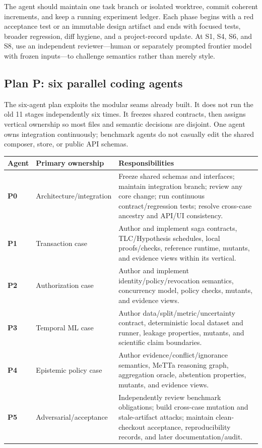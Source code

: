 \documentclass[11pt]{article}
\begin{document}
The agent should maintain one task branch or isolated worktree, commit coherent
increments, and keep a running experiment ledger.  Each phase begins with a
red acceptance test or an immutable design artifact and ends with focused
tests, broader regression, diff hygiene, and a project-record update.  At S1,
S4, S6, and S8, use an independent reviewer---human or separately prompted
frontier model with frozen inputs---to challenge semantics rather than merely
style.

\subsection{Plan P: six parallel coding agents}

The six-agent plan exploits the modular seams already built.  It does not run
the old 11 stages independently six times.  It freezes shared contracts, then
assigns vertical ownership so most files and semantic decisions are disjoint.
One agent owns integration continuously; benchmark agents do not casually edit
the shared composer, store, or public API schemas.

\begin{center}
\small
\begin{tabularx}{0.98\textwidth}{@{}>{\bfseries}p{}p{}X@{}}
\toprule
Agent & Primary ownership & Responsibilities \\
\midrule
P0 & Architecture/integration & Freeze shared schemas and interfaces; maintain integration branch; review any core change; run continuous contract/regression tests; resolve cross-case ancestry and API/UI consistency. \\
P1 & Transaction case & Author and implement saga contracts, TLC/Hypothesis schedules, local proofs/checks, reference runtime, mutants, and evidence views within its vertical. \\
P2 & Authorization case & Author and implement identity/policy/revocation semantics, concurrency model, policy checks, mutants, and evidence views. \\
P3 & Temporal ML case & Author data/split/metric/uncertainty contract, deterministic local dataset and runner, leakage properties, mutants, and scientific claim boundaries. \\
P4 & Epistemic policy case & Author evidence/conflict/ignorance semantics, MeTTa reasoning graph, aggregation oracle, abstention properties, mutants, and evidence views. \\
P5 & Adversarial/acceptance & Independently review benchmark obligations; build cross-case mutation and stale-artifact attacks; maintain clean-checkout acceptance, reproducibility records, and later documentation/audit. \\
\bottomrule
\end{tabularx}
\end{center}
\end{document}
